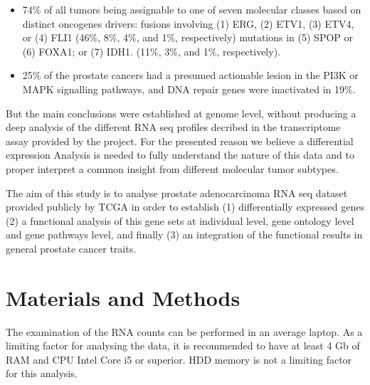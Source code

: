 \documentclass[9pt,twocolumn,twoside]{gsajnl}
\begin{document}
\begin{itemize}
\item 74\% of all tumors being assignable to one of seven molecular classes based on distinct oncogenes drivers:
        fusions involving (1) ERG, (2) ETV1, (3) ETV4, or (4) FLI1 (46\%, 8\%, 4\%, and 1\%, respectively)
        mutations in (5) SPOP or (6) FOXA1; or (7) IDH1. (11\%, 3\%, and 1\%, respectively).
\item 25\% of the prostate cancers had a presumed actionable lesion in the PI3K or MAPK signalling pathways, and DNA repair genes were inactivated in 19\%.
\end{itemize}

But the main conclusions were established at genome level, without producing a deep analysis of the different RNA seq profiles decribed in the transcriptome assay provided by the project. For the presented reason we believe a differential expression Analysis is needed to fully understand the nature of this data and to proper interpret a common insight from different molecular tumor subtypes.  

The aim of this study is to analyse prostate adenocarcinoma RNA seq dataset provided publicly by TCGA in order to establish (1) differentially expressed genes (2) a functional analysis of this gene sets at individual level, gene ontology level and gene pathways level, and finally (3) an integration of the functional results in general prostate cancer traits. 

\section*{Materials and Methods}


The examination of the RNA counts can be performed in an average laptop. As a limiting factor for analysing the data, it is recommended to have at least 4 Gb of RAM and CPU Intel Core i5 or superior. HDD memory is not a limiting factor for this analysis.
\end{document}
